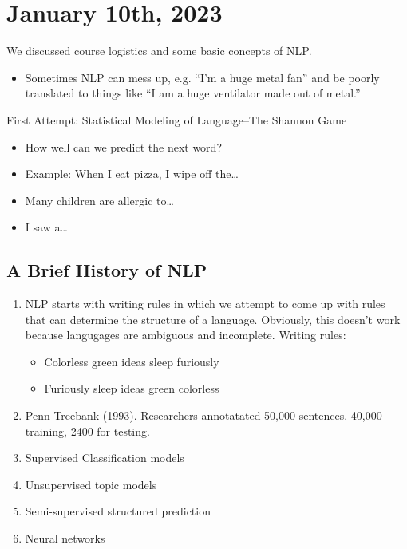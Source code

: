 \section{January 10th, 2023}

We discussed course logistics and some basic concepts of NLP.

\begin{itemize}
	\item Sometimes NLP can mess up, e.g. ``I'm a huge metal fan'' and be
	      poorly translated to things like ``I am a huge ventilator made out of metal.''
\end{itemize}

First Attempt: Statistical Modeling of Language--The Shannon Game

\begin{itemize}
	\item How well can we predict the next word?
	\item Example: When I eat pizza, I wipe off the\dots
	\item Many children are allergic to\dots
	\item I saw a\dots
\end{itemize}

\subsection{A Brief History of NLP}

\begin{enumerate}
	\item NLP starts with writing rules in which we attempt to come up with rules that can determine the structure of a language. Obviously, this doesn't work because langugages are ambiguous and incomplete. Writing rules: \begin{itemize}
		      \item Colorless green ideas sleep furiously
		      \item Furiously sleep ideas green colorless
	      \end{itemize}
	\item {} Penn Treebank (1993). Researchers annotatated 50,000 sentences. 40,000 training, 2400 for testing.
	\item Supervised Classification models
	\item Unsupervised topic models
	\item Semi-supervised structured prediction
	\item Neural networks
\end{enumerate}

